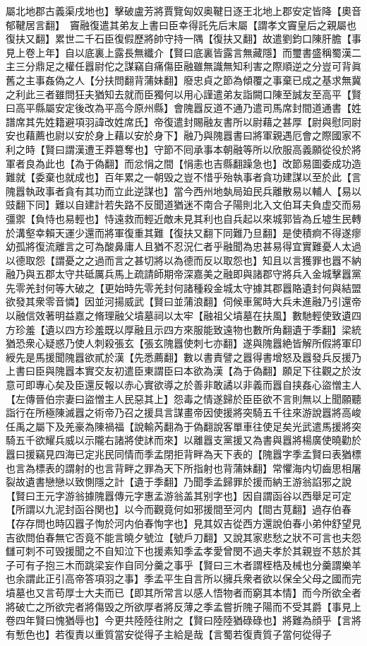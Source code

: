 屬北地郡古義渠戌地也】擊破盧芳將賈覽匈奴奥鞬日逐王北地上郡安定皆降【奧音郁鞬居言翻】　竇融復遣其弟友上書曰臣幸得託先后末屬【謂孝文竇皇后之親屬也復扶又翻】累世二千石臣復假歷將帥守持一隅【復扶又翻】故遣劉鈞口陳肝膽【事見上卷上年】自以底裏上露長無纖介【賢曰底裏皆露言無藏隱】而璽書盛稱蜀漢二主三分鼎足之權任囂尉佗之謀竊自痛傷臣融雖無識無知利害之際順逆之分豈可背眞舊之主事姦偽之人【分扶問翻背蒲妹翻】廢忠貞之節為傾覆之事棄已成之基求無冀之利此三者雖問狂夫猶知去就而臣獨何以用心謹遣弟友詣闕口陳至誠友至高平【賢曰高平縣屬安定後改為平高今原州縣】會隗囂反道不通乃遣司馬席封間道通書【姓譜席其先姓籍避項羽諱改姓席氏】帝復遣封賜融友書所以尉藉之甚厚【尉與慰同尉安也藉薦也尉以安於身上藉以安於身下】融乃與隗囂書曰將軍親遇厄會之際國家不利之時【賢曰謂漢遭王莽簒奪也】守節不囘承事本朝融等所以欣服高義願從役於將軍者良為此也【為于偽翻】而忿悁之間【悁恚也吉縣翻躁急也】改節易圖委成功造難就【委棄也就成也】百年累之一朝毁之豈不惜乎殆執事者貪功建謀以至於此【言隗囂執政事者貪有其功而立此逆謀也】當今西州地埶局廹民兵離散易以輔人【易以豉翻下同】難以自建計若失路不反聞道猶迷不南合子陽則北入文伯耳夫負虚交而易彊禦【負恃也易輕也】恃遠救而輕近敵未見其利也自兵起以來城郭皆為丘墟生民轉於溝壑幸賴天運少還而將軍復重其難【復扶又翻下同難乃旦翻】是使積痾不得遂瘳幼孤將復流離言之可為酸鼻庸人且猶不忍況仁者乎融聞為忠甚易得宜實難憂人太過以德取怨【謂憂之之過而言之甚切將以為德而反以取怨也】知且以言獲罪也囂不納融乃與五郡太守共砥厲兵馬上疏請師期帝深嘉美之融即與諸郡守將兵入金城擊囂黨先零羌封何等大破之【更始時先零羌封何諸種殺金城太守據其郡囂賂遺封何與結盟欲發其衆零音憐】因並河揚威武【賢曰並蒲浪翻】伺候車駕時大兵未進融乃引還帝以融信效著明益嘉之脩理融父墳墓祠以太牢【融祖父墳墓在扶風】數馳輕使致遺四方珍羞【遺以四方珍羞既以厚融且示四方來服能致遠物也數所角翻遺于季翻】梁統猶恐衆心疑惑乃使人刺殺張玄【張玄隗囂使刺七亦翻】遂與隗囂絶皆解所假將軍印綬先是馬援聞隗囂欲貳於漢【先悉薦翻】數以書責譬之囂得書增怒及囂發兵反援乃上書曰臣與隗囂本實交友初遣臣東謂臣曰本欲為漢【為于偽翻】願足下往觀之於汝意可即專心矣及臣還反報以赤心實欲導之於善非敢譎以非義而囂自挟姦心盜憎主人【左傳晉伯宗妻曰盜憎主人民惡其上】怨毒之情遂歸於臣臣欲不言則無以上聞願聽詣行在所極陳滅囂之術帝乃召之援具言謀畫帝因使援將突騎五千往來游說囂將高峻任禹之屬下及羌豪為陳禍福【說輸芮翻為于偽翻說客單車往使足矣光武遣馬援將突騎五千欲耀兵威以示隴右諸將使訹而來】以離囂支黨援又為書與囂將楊廣使曉勸於囂曰援竊見四海已定兆民同情而季孟閉拒背畔為天下表的【隗囂字季孟賢曰表猶標也言為標表的謂射的也言背畔之罪為天下所指射也背蒲妹翻】常懼海内切齒思相屠裂故遺書戀戀以致惻隱之計【遺于季翻】乃聞季孟歸罪於援而納王游翁諂邪之說【賢曰王元字游翁據隗囂傳元字惠孟游翁盖其别字也】因自謂函谷以西舉足可定【所謂以九泥封函谷関也】以今而觀竟何如邪援間至河内【間古莧翻】過存伯春【存存問也時囚囂子恂於河内伯春恂字也】見其奴吉從西方還說伯春小弟仲舒望見吉欲問伯春無它否竟不能言曉夕號泣【號戶刀翻】又說其家悲愁之狀不可言也夫怨讎可刺不可毁援聞之不自知泣下也援素知季孟孝愛曾閔不過夫孝於其親豈不慈於其子可有子抱三木而跳梁妄作自同分羹之事乎【賢曰三木者謂桎梏及械也分羹謂樂羊也余謂此正引高帝答項羽之事】季孟平生自言所以擁兵衆者欲以保全父母之國而完墳墓也又言苟厚士大夫而已【即其所常言以感人悟物者而窮其本情】而今所欲全者將破亡之所欲完者將傷毁之所欲厚者將反薄之季孟嘗折隗子陽而不受其爵【事見上卷四年賢曰愧猶辱也】今更共陸陸往附之【賢曰陸陸猶碌碌也】將難為顔乎【言將有慙色也】若復責以重質當安從得子主給是哉【言蜀若復責質子當何從得子